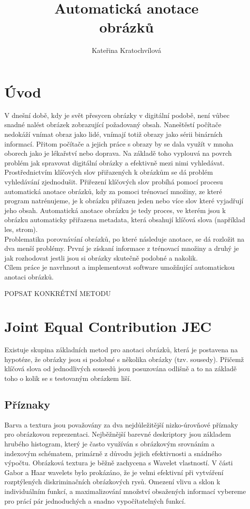 \documentclass[czech,BP]{thesiskiv}
\author{Kateřina Kratochvílová}
\title{Automatická anotace\\obrázků}
\begin{document}
%
\maketitle
\tableofcontents

\chapter{Úvod}
V dnešní době, kdy je svět přesycen obrázky v digitální podobě, není vůbec snadné nalést obrázek zobrazující požadovaný obsah. Naneštěstí počítače nedokáží vnímat obraz jako lidé, vnímají totiž obrazy jako sérii binárních informací. Přitom počítače a jejich práce s obrazy by se dala využít v mnoha oborech jako je lékařství nebo doprava. Na základě toho vyplouvá na povrch problém jak spravovat digitální obrázky a efektivně mezi nimi vyhledávat. Prostřednictvím klíčových slov přiřazených k obrázkům se dá problém vyhledávání zjednodušit. Přiřezení klíčových slov probíhá pomocí procesu automatická anotace obrázků, kdy za pomoci trénovací množiny, ze které program natrénujeme, je k obrázku přiřazen jeden nebo více slov které vyjadřují jeho obsah. Automatická anotace obrázku je tedy proces, ve kterém jsou k obrázku automaticky přiřazena metadata, která obsahují klíčová slova (například les, strom). \\

Problematika porovnávání obrázků, po které následuje anotace, se dá rozložit na dva menší problémy. První je získaní informace z trénovací množiny a druhý je jak rozhodovat jestli jsou si obrázky skutečně podobné a nakolik. \\

Cílem práce je navrhnout a implementovat software umožňující automatickou anotaci obrázků. 

POPSAT KONKRÉTNÍ METODU

 
% 
%

{\raggedright\small

}

\chapter{Joint Equal Contribution JEC}
Existuje skupina základních metod pro anotaci obrázků, která je postavena na hypotéze, že obrázky jsou si podobné s několika obrázky (tzv. sousedy). Přičemž klíčová slova od jednodlivých sousedů jsou posuzována odlišně a to na základě toho o kolik se s testovaným obrázkem liší. 
\section{Příznaky}
Barva a textura jsou považovány za dva nejdůležitější nizko-úrovňové příznaky pro obrázkovou reprezentaci. Nejběžnější barevné deskriptory jsou základem hrubého histogram, který je často využíván s obrázkovým srovnáním a indexovým schématem, primárně z důvodu jejich efektivnosti a snádného výpočtu. Obrázková textura je běžně zachycena s Wavelet vlastností. V části Gabor a Haar wavelets bylo prokázáno, že je velmi efektivní při vytváření rozptýlených diskriminačních obrázkových rysů. Omezení vlivu a sklon k individuálním funkcí, a maximalizování množství obsažených informací vybereme pro prácí pár jednoduchých a snadno vypočítatelných funkcí. 
\end{document}
